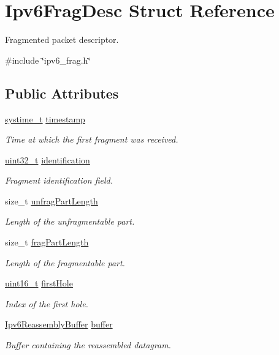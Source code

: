 \hypertarget{structIpv6FragDesc}{}\section{Ipv6\+Frag\+Desc Struct Reference}
\label{structIpv6FragDesc}


Fragmented packet descriptor.  




{\ttfamily \#include \char`\"{}ipv6\+\_\+frag.\+h\char`\"{}}

\subsection*{Public Attributes}
\begin{DoxyCompactItemize}
\item 
\hyperlink{compiler__port_8h_ae3e32a98d431a02106616da3071832dd}{systime\+\_\+t} \hyperlink{structIpv6FragDesc_ab6e5ead9ee6cc2e4e026b6aef89d76a1}{timestamp}
\begin{DoxyCompactList}\small\item\em Time at which the first fragment was received. \end{DoxyCompactList}\item 
\hyperlink{stdint_8h_a435d1572bf3f880d55459d9805097f62}{uint32\+\_\+t} \hyperlink{structIpv6FragDesc_a2c2575ed800af0856ec9f0db94039158}{identification}
\begin{DoxyCompactList}\small\item\em Fragment identification field. \end{DoxyCompactList}\item 
size\+\_\+t \hyperlink{structIpv6FragDesc_a8304cd1b608d13d100617e40f170a079}{unfrag\+Part\+Length}
\begin{DoxyCompactList}\small\item\em Length of the unfragmentable part. \end{DoxyCompactList}\item 
size\+\_\+t \hyperlink{structIpv6FragDesc_a211456cd7a2b9db9d3892b5c54b348df}{frag\+Part\+Length}
\begin{DoxyCompactList}\small\item\em Length of the fragmentable part. \end{DoxyCompactList}\item 
\hyperlink{stdint_8h_a273cf69d639a59973b6019625df33e30}{uint16\+\_\+t} \hyperlink{structIpv6FragDesc_a9e51e5d6a1717ca6d115fac412a72515}{first\+Hole}
\begin{DoxyCompactList}\small\item\em Index of the first hole. \end{DoxyCompactList}\item 
\hyperlink{structIpv6ReassemblyBuffer}{Ipv6\+Reassembly\+Buffer} \hyperlink{structIpv6FragDesc_ac1c2c93db751730aa55d827f14c5ba60}{buffer}
\begin{DoxyCompactList}\small\item\em Buffer containing the reassembled datagram. \end{DoxyCompactList}\end{DoxyCompactItemize}


